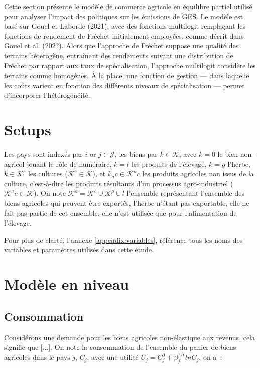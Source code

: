 Cette section présente le modèle de commerce agricole en équilibre partiel utilisé pour analyser l’impact des politiques sur les émissions de GES. Le modèle est basé sur Gouel et Laborde (2021), avec des fonctions multilogit remplaçant les fonctions de rendement de Fréchet initialement employées, comme décrit dans Gouel et al. (202?). Alors que l’approche de Fréchet suppose une qualité des terrains hétérogène, entraînant des rendements suivant une distribution de Fréchet par rapport aux taux de spécialisation, l’approche multilogit considère les terrains comme homogènes. À la place, une fonction de gestion — dans laquelle les coûts varient en fonction des différents niveaux de spécialisation — permet d’incorporer l’hétérogénéité.


\section{Setups}

Les pays sont indexés par $i$ or $j \in \mathcal{J}$, les biens par $k \in \mathcal{K}$, avec $k=0$ le bien non-agricol jouant le rôle de numéraire, $k = l$ les produits de l’élevage, $k = g$ l’herbe, $k \in \mathcal{K}^c$ les cultures ($\mathcal{K}^c \in \mathcal{K}$), et $k_nc \in \mathcal{K}^nc$ les produits agricoles non issus de la culture, c’est-à-dire les produits résultants d’un processus agro-industriel ($\mathcal{K}^nc \subset \mathcal{K}$). On note $\mathcal{K}^a = \mathcal{K}^c \cup \mathcal{K}^p \cup l$ l’ensemble représentant l’ensemble des biens agricoles qui peuvent être exportés, l’herbe n’étant pas exportable, elle ne fait pas partie de cet ensemble, elle n’est utilisée que pour l’alimentation de l’élevage.

Pour plus de clarté, l’annexe \ref{appendix:variables}, référence tous les noms des variables et paramètres utilisés dans cette étude.

\section{Modèle en niveau}
\subsection{Consommation}
Considérons une demande pour les biens agricoles non-élastique aux revenus, cela signifie que [...]. On note la consommation de l’ensemble du panier de biens agricoles dans le pays $j$, $C_j$, avec une utilité $U_j = C_j^0 + \beta_j^{1/\epsilon} ln C_j$, on a~:

